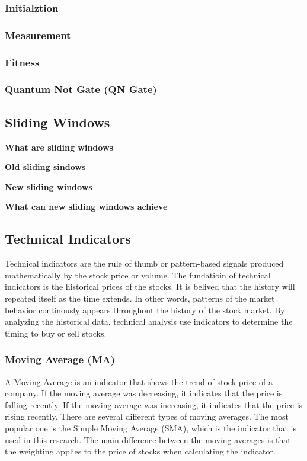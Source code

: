 \documentclass[../main.tex]{subfiles}
\begin{document}
\bigbreak

\subsubsection{Initialztion}


\subsubsection{Measurement}

\subsubsection{Fitness}

\subsubsection{Quantum Not Gate (QN Gate)}

\subsection{Sliding Windows}
\textbf{What are sliding windows}

\textbf{Old sliding sindows}

\textbf{New sliding windows}

\textbf{What can new sliding windows achieve}

\subsection{Technical Indicators}

Technical indicators are the rule of thumb or pattern-based signals produced mathematically by the stock price or volume. The fundatioin of technical indicators is the historical prices of the stocks. It is belived that the history will repeated itself as the time extends. In other words, patterns of the market behavior continously appears throughout the history of the stock market. By analyzing the historical data, technical analysis use indicators to determine the timing to buy or sell stocks.

\subsubsection{Moving Average (MA)}

A Moving Average is an indicator that shows the trend of stock price of a company. If the moving average was decreasing, it indicates that the price is falling recently. If the moving average was increasing, it indicates that the price is rising recently. There are several different types of moving averages. The most popular one is the Simple Moving Average (SMA), which is the indicator that is used in this research. The main difference between the moving averages is that the weighting applies to the price of stocks when calculating the indicator.
\end{document}
